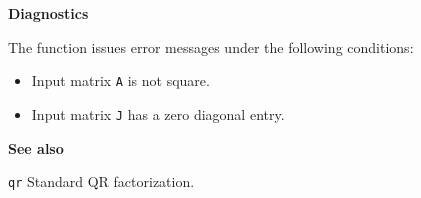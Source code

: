\documentclass[12pt,a4paper]{article}
\begin{document}
\bigskip



{\Large \textbf{Diagnostics}}



The function issues error messages under the following conditions:

\begin{itemize}

\item Input matrix {\tt A} is not square.

\item Input matrix {\tt J} has a zero diagonal entry.

\end{itemize}



\bigskip



{\Large \textbf{See also}}



{\tt qr} \hspace{1em} Standard QR factorization.
\end{document}
